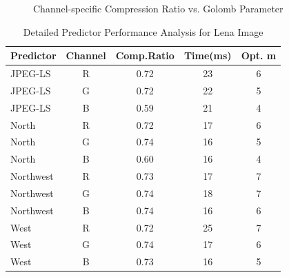 \documentclass[a4paper,14pt]{article}
\begin{document}
\begin{figure}[!htb]
\begin{minipage}{0.45\textwidth}
        \caption{Channel-specific Compression Ratio vs. Golomb Parameter}
        \label{fig:compression_ratio}
    \end{minipage}
\end{figure}

\begin{table}[!htb]
\centering
\small
\begin{tabular}{|l|c|c|c|c|}
\hline
\textbf{Predictor} & \textbf{Channel} & \textbf{Comp.Ratio} & \textbf{Time(ms)} & \textbf{Opt. m} \\
\hline
JPEG-LS & R & 0.72 & 23 & 6 \\
JPEG-LS & G & 0.72 & 22 & 5 \\
JPEG-LS & B & 0.59 & 21 & 4 \\
\hline
North & R & 0.72 & 17 & 6 \\
North & G & 0.74 & 16 & 5 \\
North & B & 0.60 & 16 & 4 \\
\hline
Northwest & R & 0.73 & 17 & 7 \\
Northwest & G & 0.74 & 18 & 7 \\
Northwest & B & 0.74 & 16 & 6 \\
\hline
West & R & 0.72 & 25 & 7 \\
West & G & 0.74 & 17 & 6 \\
West & B & 0.73 & 16 & 5 \\
\hline
\end{tabular}
\caption{Detailed Predictor Performance Analysis for Lena Image}
\label{tab:detailed_predictor_comparison}
\end{table}
\end{document}
